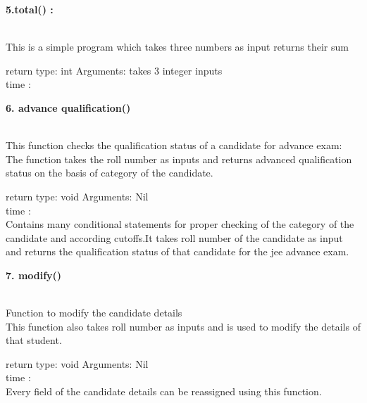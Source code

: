 \documentclass{article}
\begin{document}
   \vspace{5mm}
{\Large \textbf{5.total() :}} \\
\\
{\large This is a simple program which takes three numbers as input returns their sum\\
 \vspace{5mm}

return type: int  \hspace{5mm}  Arguments: takes 3 integer inputs\\
   time :\\
 }
 
   \vspace{5mm}
{\Large \textbf{6. advance qualification()}} \\
\\
{\large This function checks the qualification status of a candidate for advance exam:
\\The function takes the roll number as inputs and returns advanced qualification status on the basis of category of the candidate.
 \vspace{5mm}

return type: void  \hspace{5mm}  Arguments: Nil\\
   time :\\
Contains many conditional statements for proper checking of the category of the candidate and according cutoffs.It takes roll number of the candidate as input and returns the qualification status of that candidate for the jee advance exam.
 }
 
   \vspace{5mm}
{\Large \textbf{7. modify()}} \\
\\
{\large Function to modify the candidate details\\
This function also takes roll number as inputs and is used to modify the details of that student.
 \vspace{5mm}

return type: void  \hspace{5mm}  Arguments: Nil\\
   time :\\
Every field of the candidate details can be reassigned using this function.
 }
 
\end{document}
